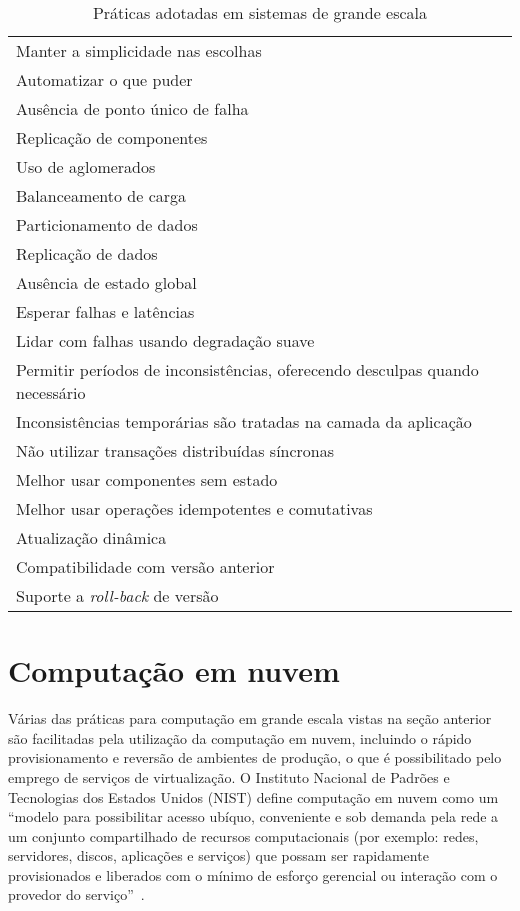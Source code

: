 \begin{table}[!t]
\begin{center}
    \begin{tabular}{l}
	 \hline
Manter a simplicidade nas escolhas \\
Automatizar o que puder \\
Ausência de ponto único de falha \\
Replicação de componentes \\
Uso de aglomerados \\
Balanceamento de carga \\
Particionamento de dados \\
Replicação de dados \\
Ausência de estado global  \\%
Esperar falhas e latências  \\
Lidar com falhas usando degradação suave \\
Permitir períodos de inconsistências, oferecendo desculpas quando necessário \\
Inconsistências temporárias são tratadas na camada da aplicação \\
Não utilizar transações distribuídas síncronas \\
Melhor usar componentes sem estado  \\%
Melhor usar operações idempotentes e comutativas \\
Atualização dinâmica \\
Compatibilidade com versão anterior \\
Suporte a \emph{roll-back} de versão \\
	 \hline
    \end{tabular}
  \caption{Práticas adotadas em sistemas de grande escala}
  \label{tab:escala}
\end{center}
\end{table}

\section{Computação em nuvem}

Várias das práticas para computação em grande escala vistas na seção anterior são facilitadas pela utilização da computação em nuvem, incluindo o rápido provisionamento e reversão de ambientes de produção, o que é possibilitado pelo emprego de serviços de virtualização. O Instituto Nacional de Padrões e Tecnologias dos Estados Unidos (NIST) define computação em nuvem como um ``modelo para possibilitar acesso ubíquo, conveniente e sob demanda pela rede a um conjunto compartilhado de recursos computacionais (por exemplo: redes, servidores, discos, aplicações e serviços) que possam ser rapidamente provisionados e liberados com o mínimo de esforço gerencial ou interação com o provedor do serviço''~\cite{Nist2011Cloud}. 

